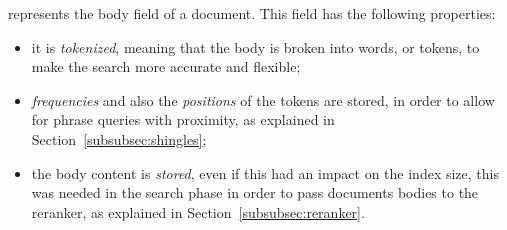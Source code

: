 represents the body field of a document. This field has the following properties:

\begin{itemize}
	\item it is \emph{tokenized}, meaning that the body is broken into words, or tokens, to make the search more accurate and flexible;
	\item \emph{frequencies} and also the \emph{positions} of the tokens are stored, in order to allow for phrase queries with proximity, as explained in Section~\ref{subsubsec:shingles};
	\item the body content is \emph{stored}, even if this had an impact on the index size, this was needed in the search phase in order to pass documents bodies to the reranker, as explained in Section~\ref{subsubsec:reranker}.
\end{itemize}
